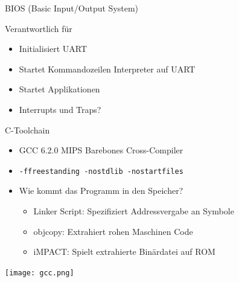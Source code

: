 \begin{frame}{BIOS (Basic Input/Output System)}

Verantwortlich für

\begin{itemize}
\item Initialisiert UART
\item Startet Kommandozeilen Interpreter auf UART
\item Startet Applikationen
\item Interrupts und Traps?
\end{itemize}

\end{frame}

\begin{frame}{C-Toolchain}

\begin{itemize}
\item GCC 6.2.0 MIPS Barebones Cross-Compiler
\item \texttt{-ffreestanding -nostdlib -nostartfiles}
\item Wie kommt das Programm in den Speicher?
\begin{itemize}
    \item Linker Script: Spezifiziert Addressvergabe an Symbole
    \item objcopy: Extrahiert rohen Maschinen Code
    \item iMPACT: Spielt extrahierte Binärdatei auf ROM
\end{itemize}
\end{itemize}
\begin{center}
\texttt{[image: gcc.png]}
\end{center}


\end{frame}

